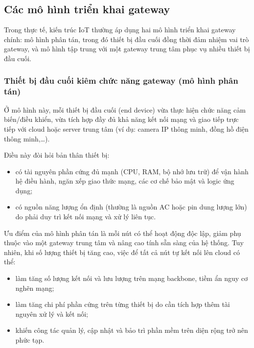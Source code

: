         \subsection{Các mô hình triển khai gateway}
            Trong thực tế, kiến trúc IoT thường áp dụng hai mô hình triển khai gateway chính: mô hình phân tán, trong đó thiết bị đầu cuối đồng thời đảm nhiệm vai trò gateway, và mô hình tập trung với một gateway trung tâm phục vụ nhiều thiết bị đầu cuối.
            
            \subsubsection*{Thiết bị đầu cuối kiêm chức năng gateway (mô hình phân tán)}
                Ở mô hình này, mỗi thiết bị đầu cuối (end device) vừa thực hiện chức năng cảm biến/điều khiển, vừa tích hợp đầy đủ khả năng kết nối mạng và giao tiếp trực tiếp với cloud hoặc server trung tâm (ví dụ: camera IP thông minh, đồng hồ điện thông minh,\dots).
                
                Điều này đòi hỏi bản thân thiết bị:
                \begin{itemize}
                    \item có tài nguyên phần cứng đủ mạnh (CPU, RAM, bộ nhớ lưu trữ) để vận hành hệ điều hành, ngăn xếp giao thức mạng, các cơ chế bảo mật và logic ứng dụng;
                    \item có nguồn năng lượng ổn định (thường là nguồn AC hoặc pin dung lượng lớn) do phải duy trì kết nối mạng và xử lý liên tục.
                \end{itemize}
                
                Ưu điểm của mô hình phân tán là mỗi nút có thể hoạt động độc lập, giảm phụ thuộc vào một gateway trung tâm và nâng cao tính sẵn sàng của hệ thống. Tuy nhiên, khi số lượng thiết bị tăng cao, việc để tất cả nút tự kết nối lên cloud có thể:
                \begin{itemize}
                    \item làm tăng số lượng kết nối và lưu lượng trên mạng backbone, tiềm ẩn nguy cơ nghẽn mạng;
                    \item làm tăng chi phí phần cứng trên từng thiết bị do cần tích hợp thêm tài nguyên xử lý và kết nối;
                    \item khiến công tác quản lý, cập nhật và bảo trì phần mềm trên diện rộng trở nên phức tạp.
                \end{itemize}
            
